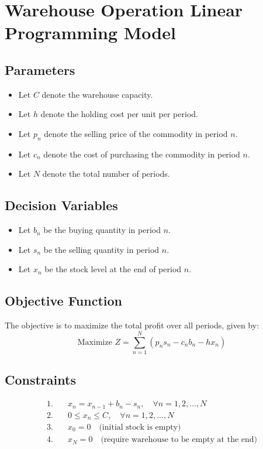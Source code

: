 \documentclass{article}
\begin{document}
\section*{Warehouse Operation Linear Programming Model}

\subsection*{Parameters}
\begin{itemize}
    \item Let \( C \) denote the warehouse capacity.
    \item Let \( h \) denote the holding cost per unit per period.
    \item Let \( p_n \) denote the selling price of the commodity in period \( n \).
    \item Let \( c_n \) denote the cost of purchasing the commodity in period \( n \).
    \item Let \( N \) denote the total number of periods.
\end{itemize}

\subsection*{Decision Variables}
\begin{itemize}
    \item Let \( b_n \) be the buying quantity in period \( n \).
    \item Let \( s_n \) be the selling quantity in period \( n \).
    \item Let \( x_n \) be the stock level at the end of period \( n \).
\end{itemize}

\subsection*{Objective Function}
The objective is to maximize the total profit over all periods, given by:
\[
\text{Maximize } Z = \sum_{n=1}^{N} (p_n s_n - c_n b_n - h x_n)
\]

\subsection*{Constraints}
\begin{align*}
1. & \quad x_n = x_{n-1} + b_n - s_n, \quad \forall n = 1, 2, \ldots, N \\
2. & \quad 0 \leq x_n \leq C, \quad \forall n = 1, 2, \ldots, N \\
3. & \quad x_0 = 0 \quad \text{(initial stock is empty)} \\
4. & \quad x_N = 0 \quad \text{(require warehouse to be empty at the end)}
\end{align*}
\end{document}
